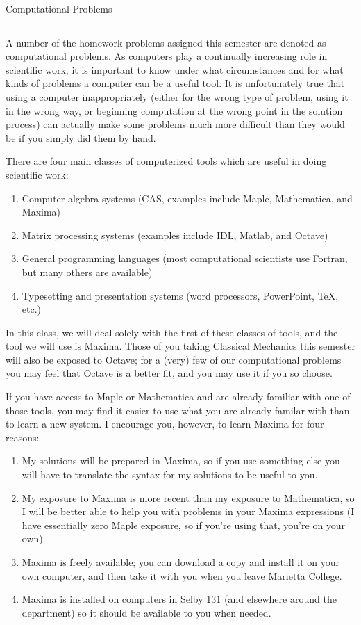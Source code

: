\documentclass{article}
\begin{document}
\centerline{\Large Computational Problems}
\vskip0.1cm\hrule\vskip0.5cm A number of the homework problems
assigned this semester are denoted as computational problems.  As
computers play a continually increasing role in scientific work, it is
important to know under what circumstances and for what kinds of
problems a computer can be a useful tool.  It is unfortunately true
that using a computer inappropriately (either for the wrong type of
problem, using it in the wrong way, or beginning computation at the
wrong point in the solution process) can actually make some problems
much more difficult than they would be if you simply did them by hand.

There are four main classes of computerized tools which are useful in
doing scientific work:
\begin{enumerate}
\item Computer algebra systems (CAS, examples include Maple,
  Mathematica, and Maxima)
\item Matrix processing systems (examples include IDL, Matlab, and
  Octave)
\item General programming languages (most computational scientists use
  Fortran, but many others are available)
\item Typesetting and presentation systems (word processors,
  PowerPoint, TeX, etc.)
\end{enumerate}
In this class, we will deal solely with the first of these classes of
tools, and the tool we will use is Maxima.  Those of you taking
Classical Mechanics this semester will also be exposed to Octave; for
a (very) few of our computational problems you may feel that Octave is
a better fit, and you may use it if you so choose.

If you have access to Maple or Mathematica and are already familiar
with one of those tools, you may find it easier to use what you are
already familar with than to learn a new system.  I encourage you,
however, to learn Maxima for four reasons:
\begin{enumerate}
\item My solutions will be prepared in Maxima, so if you use something
  else you will have to translate the syntax for my solutions to be
  useful to you.
\item My exposure to Maxima is more recent than my exposure to
  Mathematica, so I will be better able to help you with problems in
  your Maxima expressions (I have essentially zero Maple exposure, so
  if you're using that, you're on your own).
\item Maxima is freely available; you can download a copy and install
  it on your own computer, and then take it with you when you leave
  Marietta College.
\item Maxima is installed on computers in Selby 131 (and elsewhere
  around the department) so it should be available to you when needed.
\end{enumerate}
\end{document}
